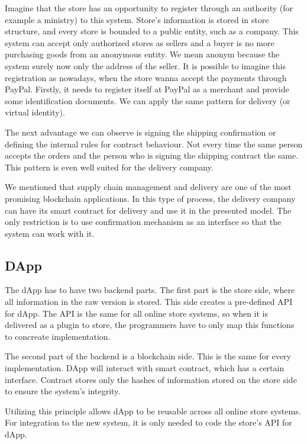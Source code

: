 \documentclass[thesis=M,english]{FITthesis}[2019/12/23]
\begin{document}
Imagine that the store has an opportunity to register through an authority (for example a ministry) to this system. Store's information is stored in store structure, and every store is bounded to a public entity, such as a company. This system can accept only authorized stores as sellers and a buyer is no more purchasing goods from an anonymous entity. We mean anonym because the system surely now only the address of the seller. It is possible to imagine this registration as nowadays, when the store wanna accept the payments through PayPal. Firstly, it needs to register itself at PayPal as a merchant and provide some identification documents. We can apply the same pattern for delivery (or virtual identity).

The next advantage we can observe is signing the shipping confirmation or defining the internal rules for contract behaviour. Not every time the same person accepts the orders and the person who is signing the shipping contract the same. This pattern is even well suited for the delivery company. 

We mentioned that supply chain management and delivery are one of the most promising blockchain applications. In this type of process, the delivery company can have its smart contract for delivery and use it in the presented model. The only restriction is to use confirmation mechanism as an interface so that the system can work with it. 


\subsection{DApp}
%
%
%
The dApp has to have two backend parts. The first part is the store side, where all information in the raw version is stored. This side creates a pre-defined API for dApp. The API is the same for all online store systems, so when it is delivered as a plugin to store, the programmers have to only map this functions to concreate implementation.

The second part of the backend is a blockchain side. This is the same for every implementation. DApp will interact with smart contract, which has a certain interface. Contract stores only the hashes of information stored on the store side to ensure the system's integrity. 

Utilizing this principle allows dApp to be reusable across all online store systems. For integration to the new system, it is only needed to code the store's API for dApp.
\end{document}
